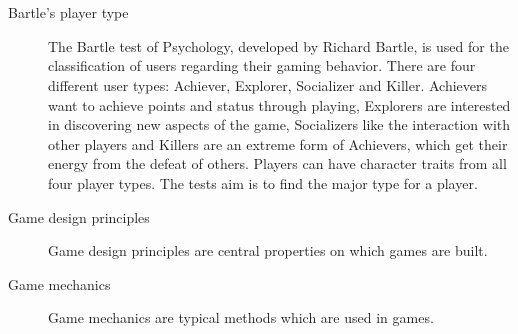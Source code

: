\chapter*{\nameofglossary}


\begin{description}
	\item[Bartle's player type] The Bartle test of Psychology, developed by Richard Bartle, is used for the classification of users regarding their gaming behavior. There are four different user types: Achiever, Explorer, Socializer and Killer. Achievers want to achieve points and status through playing, Explorers are interested in discovering new aspects of the game, Socializers like the interaction with other players and Killers are an extreme form of Achievers, which get their energy from the defeat of others. Players can have character traits from all four player types. The tests aim is to find the major type for a player. \cite[p. 44, 45]{kumarGamificationWorkDesigning2013}
\end{description}

\begin{description}
	\item[Game design principles] Game design principles are central properties on which games are built. \cite[p. 8]{kumarGamificationWorkDesigning2013}
\end{description}

\begin{description}
	\item[Game mechanics] Game mechanics are typical methods which are used in games. \cite[p. 8]{kumarGamificationWorkDesigning2013}
\end{description}

